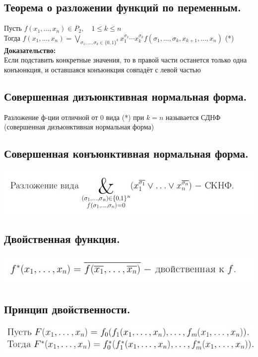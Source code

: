 \documentclass[12pt]{article}
\begin{document}
\subsection{Теорема о разложении функций по переменным.}
	Пусть $f(x_1,\dotsc,x_n) \in P_2, \quad 1 \leqslant k \leqslant n$\\
	Тогда $f(x_1,\dotsc,x_n) = \displaystyle\bigvee_{\sigma_1,\dotsc,\sigma_k \in \{0,1\}^k}x_1^{\sigma_1}\dotsm x_k^{\sigma_k} f(\sigma_1, \dotsc, \sigma_k, x_{k+1}, \dotsc, x_{n})$ (*)\\
	\textbf{Доказательство:}\\
		Если подставить конкретные значения, то в правой части останется только одна конъюнкция, и оставшаяся конъюнкция совпадёт с левой частью\\ 
	\qedsymbol
\subsection{Совершенная дизъюнктивная нормальная форма.}
	Разложение ф-ции отличной от $0$ вида (*) при $k=n$ называется СДНФ (совершенная дизъюнктивная нормальная форма)
\subsection{Совершенная конъюнктивная нормальная форма.}
	\includegraphics[width=400pt]{18}
\subsection{Двойственная функция.}
	\includegraphics[width=400pt]{19}
\subsection{Принцип двойственности.}
	\includegraphics[width=400pt]{20}
\end{document}
